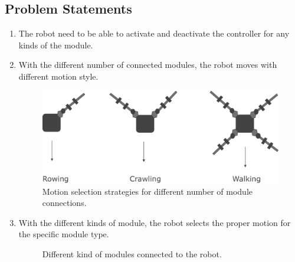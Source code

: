 \subsection{Problem Statements}
\begin{enumerate}
    \item The robot need to be able to activate and deactivate the controller for any kinds of the module.

    \item With the different number of connected modules, the robot moves with different motion style.

\begin{figure}[h]
  \centering
  \includegraphics[width=110mm]{./fig/chap3/control_system/motion_selection.pdf}
  \vspace{2mm}
  \caption{Motion selection strategies for different number of module connections.}\label{motion_selection}
\end{figure}

    \item With the different kinds of module, the robot selects the proper motion for the specific module type.

\begin{figure}[h]
  \centering
  \vspace{2mm}
  \caption{Different kind of modules connected to the robot.}\label{gripper}
\end{figure}
\end{enumerate}

